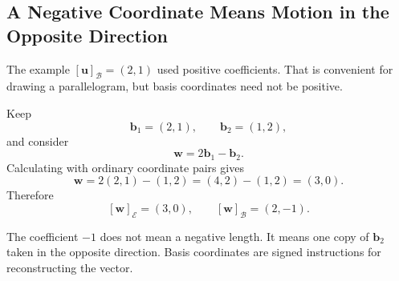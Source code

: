 \subsection{A Negative Coordinate Means Motion in the Opposite Direction}

\begin{examplebox}
The example $[\mathbf u]_{\mathcal B}=(2,1)$ used positive coefficients. That
is convenient for drawing a parallelogram, but basis coordinates need not be
positive.

Keep
\[
\mathbf b_1=(2,1),
\qquad
\mathbf b_2=(1,2),
\]
and consider
\[
\mathbf w=2\mathbf b_1-\mathbf b_2.
\]
Calculating with ordinary coordinate pairs gives
\[
\mathbf w
=2(2,1)-(1,2)
=(4,2)-(1,2)
=(3,0).
\]
Therefore
\[
[\mathbf w]_{\mathcal E}=(3,0),
\qquad
[\mathbf w]_{\mathcal B}=(2,-1).
\]

\begin{center}
\end{center}

The coefficient $-1$ does not mean a negative length. It means one copy of
$\mathbf b_2$ taken in the opposite direction. Basis coordinates are signed
instructions for reconstructing the vector.
\end{examplebox}
